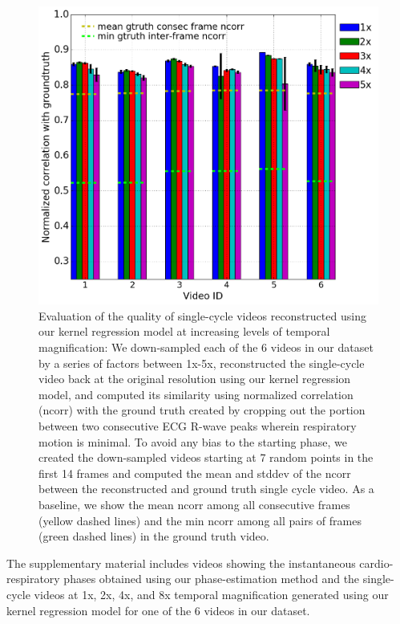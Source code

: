 \documentclass[journal]{IEEEtran}
\newcounter{lfigcounter}
\begin{document}
\begin{figure}[h]
\centering
\setcounter{lfigcounter}{1}
%
\includegraphics[width=0.9 \linewidth]{figures/single_cycle_video_reconstruction.png}
%
\caption{Evaluation of the quality of single-cycle videos reconstructed using our kernel regression model at increasing levels of temporal magnification: We down-sampled each of the 6 videos in our dataset by a series of factors between 1x-5x, reconstructed the single-cycle video back at the original resolution using our kernel regression model, and computed its similarity using normalized correlation (ncorr) with the ground truth created by cropping out the portion between two consecutive ECG R-wave peaks wherein respiratory motion is minimal. To avoid any bias to the starting phase, we created the down-sampled videos starting at 7 random points in the first 14 frames and computed the mean and stddev of the ncorr between the reconstructed and ground truth single cycle video. As a baseline, we show the mean ncorr among all consecutive frames (yellow dashed lines) and the min ncorr among all pairs of frames (green dashed lines) in the ground truth video.}
\label{fig:single_cycle_video_recon}
\end{figure}

The supplementary material includes videos showing the instantaneous cardio-respiratory phases obtained using our phase-estimation method and the single-cycle videos at 1x, 2x, 4x, and 8x temporal magnification generated using our kernel regression model for one of the 6 videos in our dataset. 

\vspace{-0.3cm}
\end{document}
